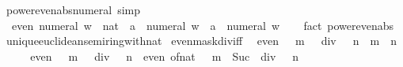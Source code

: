 \begin{isabellebody}
\endisatagproof
{\isafoldproof}%
%
\isadelimproof
\isanewline
%
\endisadelimproof
\isanewline
{}\isamarkupfalse%
\ power{\isacharunderscore}{\kern0pt}even{\isacharunderscore}{\kern0pt}abs{\isacharunderscore}{\kern0pt}numeral\ {\isacharbrackleft}{\kern0pt}simp{\isacharbrackright}{\kern0pt}{\isacharcolon}{\kern0pt}\isanewline
\ \ {\isachardoublequoteopen}even\ {\isacharparenleft}{\kern0pt}numeral\ w\ {\isacharcolon}{\kern0pt}{\isacharcolon}{\kern0pt}\ nat{\isacharparenright}{\kern0pt}\ {\isasymLongrightarrow}\ {\isasymbar}a{\isasymbar}\ {\isacharcircum}{\kern0pt}\ numeral\ w\ {\isacharequal}{\kern0pt}\ a\ {\isacharcircum}{\kern0pt}\ numeral\ w{\isachardoublequoteclose}\isanewline
%
\isadelimproof
\ \ %
\endisadelimproof
%
\isatagproof
{}\isamarkupfalse%
\ {\isacharparenleft}{\kern0pt}fact\ power{\isacharunderscore}{\kern0pt}even{\isacharunderscore}{\kern0pt}abs{\isacharparenright}{\kern0pt}%
\endisatagproof
{\isafoldproof}%
%
\isadelimproof
\isanewline
%
\endisadelimproof
\isanewline
{}\isamarkupfalse%
\isanewline
\isanewline
{}\isamarkupfalse%
\ unique{\isacharunderscore}{\kern0pt}euclidean{\isacharunderscore}{\kern0pt}semiring{\isacharunderscore}{\kern0pt}with{\isacharunderscore}{\kern0pt}nat\isanewline
{}\isanewline
\isanewline
{}\isamarkupfalse%
\ even{\isacharunderscore}{\kern0pt}mask{\isacharunderscore}{\kern0pt}div{\isacharunderscore}{\kern0pt}iff{\isacharprime}{\kern0pt}{\isacharcolon}{\kern0pt}\isanewline
\ \ {\isacartoucheopen}even\ {\isacharparenleft}{\kern0pt}{\isacharparenleft}{\kern0pt}{}\ {\isacharcircum}{\kern0pt}\ m\ {\isacharminus}{\kern0pt}\ {}{\isacharparenright}{\kern0pt}\ div\ {}\ {\isacharcircum}{\kern0pt}\ n{\isacharparenright}{\kern0pt}\ {\isasymlongleftrightarrow}\ m\ {\isasymle}\ n{\isacartoucheclose}\isanewline
%
\isadelimproof
%
\endisadelimproof
%
\isatagproof
{}\isamarkupfalse%
\ {\isacharminus}{\kern0pt}\isanewline
\ \ \isamarkupfalse%
\ {\isacartoucheopen}even\ {\isacharparenleft}{\kern0pt}{\isacharparenleft}{\kern0pt}{}\ {\isacharcircum}{\kern0pt}\ m\ {\isacharminus}{\kern0pt}\ {}{\isacharparenright}{\kern0pt}\ div\ {}\ {\isacharcircum}{\kern0pt}\ n{\isacharparenright}{\kern0pt}\ {\isasymlongleftrightarrow}\ even\ {\isacharparenleft}{\kern0pt}of{\isacharunderscore}{\kern0pt}nat\ {\isacharparenleft}{\kern0pt}{\isacharparenleft}{\kern0pt}{}\ {\isacharcircum}{\kern0pt}\ m\ {\isacharminus}{\kern0pt}\ Suc\ {}{\isacharparenright}{\kern0pt}\ div\ {}\ {\isacharcircum}{\kern0pt}\ n{\isacharparenright}{\kern0pt}{\isacharparenright}{\kern0pt}{\isacartoucheclose}\isanewline

\end{isabellebody}
